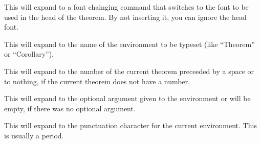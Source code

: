 \begin{command}{\inserttheoremheadfont}
  This will expand to a font chainging command that switches to the
  font to be used in the head of the theorem. By not inserting it, you
  can ignore the head font.
\end{command}

\begin{command}{\inserttheoremname}
  This will expand to the name of the environment to be typeset (like
  ``Theorem'' or ``Corollary''). 
\end{command}


\begin{command}{\inserttheoremnumber}
  This will expand to the number of the current theorem preceeded by a
  space or to nothing, if the current theorem does not have a number.
\end{command}

\begin{command}{\inserttheoremaddition}
  This will expand to the optional argument given to the environment
  or will be empty, if there was no optional argument.
\end{command}

\begin{command}{\inserttheorempunctuation}
  This will expand to the punctuation character for the current
  environment. This is usually a period.
\end{command}










